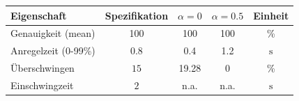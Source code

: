\begin{table}[h!]
	\centering
	\begin{tabular}{l c c c c}
		Eigenschaft
			& Spezifikation
			& $\alpha = 0$
			& $\alpha = 0.5$
			& Einheit \\
		\hline
		Genauigkeit (mean)
			& 100
			& 100 
			& 100
			& \% \\
		Anregelzeit (0-99\%)
			& $0.8$
			& 0.4
			& 1.2
			& $\si{\second}$ \\
		Überschwingen
			& $15$
			& 19.28
			& 0
			& \% \\
		Einschwingzeit
			& $2$
			& n.a. 
			& n.a.
			& $\si{\second}$ \\
	\end{tabular}
\end{table}
